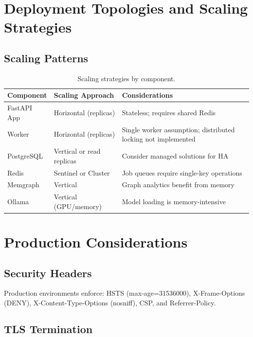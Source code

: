 \documentclass[a4paper,twoside]{sapthesis}
\begin{document}
\section{Deployment Topologies and Scaling Strategies}
\label{sec:deployment-topologies}

\subsection{Scaling Patterns}

\begin{table}[ht]
\centering
\caption{Scaling strategies by component.}
\label{tab:scaling-strategies}
\small
\begin{tabular}{lp{4cm}p{5cm}}
\hline
\textbf{Component} & \textbf{Scaling Approach} & \textbf{Considerations} \\
\midrule
FastAPI App & Horizontal (replicas) & Stateless; requires shared Redis \\
Worker & Horizontal (replicas) & Single worker assumption; distributed locking not implemented \\
PostgreSQL & Vertical or read replicas & Consider managed solutions for HA \\
Redis & Sentinel or Cluster & Job queues require single-key operations \\
Memgraph & Vertical & Graph analytics benefit from memory \\
Ollama & Vertical (GPU/memory) & Model loading is memory-intensive \\
\midrule
\end{tabular}
\end{table}

\section{Production Considerations}
\label{sec:production}

\subsection{Security Headers}

Production environments enforce: HSTS (max-age=31536000), X-Frame-Options (DENY), X-Content-Type-Options (nosniff), CSP, and Referrer-Policy.

\subsection{TLS Termination}
\end{document}
